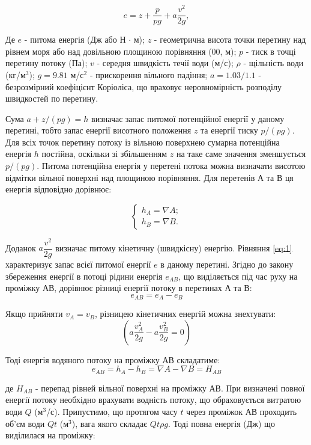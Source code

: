 \documentclass[12pt]{article}
\numberwithin{equation}{section}
\numberwithin{figure}{section}
\begin{document}
\begin{equation}\label{eq:1}
e = z + \dfrac{p}{pg} + a \dfrac{v^2}{2g},
\end{equation}

Де $e$ - питома енергія (Дж або Н $\cdot$ м); $z$ - геометрична висота точки перетину над рівнем моря або над довільною площиною порівняння (00, м); $p$ - тиск в точці перетину потоку (Па); $v$ - середня швидкість течії води (м/с); $\rho$ - щільність води (кг/м$^3$); $g=9.81$ м/с$^2$ - прискорення вільного падіння; $a=1.03 / 1.1$ - безрозмірний коефіцієнт Коріоліса, що враховує неровномірність розподілу швидкостей по перетину.

Сума $a+z / (pg)=h$ визначає запас питомої потенційної енергії у даному перетині, тобто запас енергії висотного положення $z$ та енергії тиску $p/(pg)$. Для всіх точок перетину потоку із вільною поверхнею сумарна потенційна енергія $h$ постійна, оскільки зі збільшенням $z$ на таке саме значення зменшується $p/(pg)$. Питома потенційна енергія у перетені потока можна визначати висотою відмітки вільної поверхні над площиною порівняння. Для перетенів А та В ця енергія відповідно дорівнює:

\begin{equation}\label{eq:2}
\left\{
\begin{array}{l}
    h_A = \nabla A; \\
    h_B = \nabla B.
\end{array}
\right.
\end{equation}

Доданок $a\dfrac{v^2}{2g}$ визначає питому кінетичну (швидкісну) енергію. Рівняння \ref{eq:1} характеризує запас всієї питомої енергії $e$ в даному перетині. Згідно до закону збереження енергії в потоці рідини енергія $e_{AB}$, що виділяється під час руху на проміжку АВ, дорівнює різниці енергії потоку в перетинах А та В:
\begin{equation}\label{eq:3}
e_{AB} = e_A - e_B
\end{equation}

Якщо прийняти $v_A = v_B$, різницею кінетичних енергій можна знехтувати:
\[
\left(
a\frac{v^2_A}{2g} - a\frac{v^2_B}{2g} = 0
\right)
\]

Тоді енергія водяного потоку на проміжку АВ складатиме:
\begin{equation}\label{eq:4}
e_{AB} = h_A - h_B = \nabla A - \nabla B = H_{AB}
\end{equation}

де $H_{AB}$ - перепад рівней вільної поверхні на проміжку АВ. При визначені повної енергії потоку необхідно врахувати водність потоку, що обраховується витратою води $Q$ (м$^3$/с). Припустимо, що протягом часу $t$ через проміжок АВ проходить об'єм води $Qt$ (м$^3$), вага якого складає $Qt\rho g$. Тоді повна енергія (Дж) що виділилася на проміжку:
\end{document}
